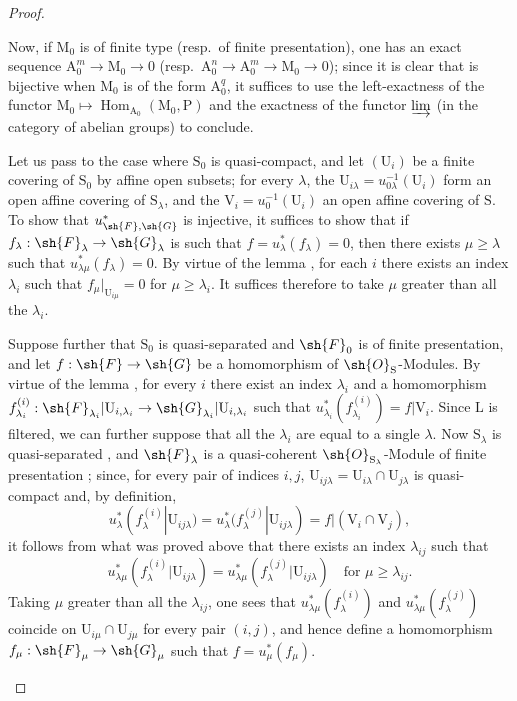\begin{proof}
\begin{enumerate}[label=(\roman*)]
Now, if $\mathrm{M}_0$ is of finite type (resp.\ of finite presentation), one has an exact sequence $\mathrm{A}_0^m\to\mathrm{M}_0\to 0$ (resp.\ $\mathrm{A}_0^n\to\mathrm{A}_0^m\to\mathrm{M}_0\to 0$); since it is clear that  is bijective when $\mathrm{M}_0$ is of the form $\mathrm{A}_0^q$, it suffices to use the left-exactness of the functor $\mathrm{M}_0\mapsto\operatorname{Hom}_{\mathrm{A}_0}(\mathrm{M}_0,\mathrm{P})$ and the exactness of the functor $\varinjlim$ (in the category of abelian groups) to conclude.

\medskip
Let us pass to the case where $\mathrm{S}_0$ is quasi-compact, and let $(\mathrm{U}_i)$ be a finite covering of $\mathrm{S}_0$ by affine open subsets; for every $\lambda$, the $\mathrm{U}_{i\lambda}=u_{0\lambda}^{-1}(\mathrm{U}_i)$ form an open affine covering of $\mathrm{S}_\lambda$, and the $\mathrm{V}_i=u_0^{-1}(\mathrm{U}_i)$ an open affine covering of $\mathrm{S}$.
To show that $u_{\sh{F},\sh{G}}^*$ is injective, it suffices to show that if $f_\lambda:\sh{F}_\lambda\to\sh{G}_\lambda$ is such that $f=u_\lambda^*(f_\lambda)=0$, then there exists $\mu\geqslant\lambda$ such that $u_{\lambda\mu}^*(f_\lambda)=0$.
By virtue of the lemma , for each $i$ there exists an index $\lambda_i$ such that $f_\mu|_{\mathrm{U}_{i\mu}}=0$ for $\mu\geqslant\lambda_i$.
It suffices therefore to take $\mu$ greater than all the $\lambda_i$.

Suppose further that $\mathrm{S}_0$ is quasi-separated and $\sh{F}_0$ is of finite presentation, and let $f:\sh{F}\to\sh{G}$ be a homomorphism of $\sh{O}_\mathrm{S}$-Modules.
By virtue of the lemma , for every $i$ there exist an index $\lambda_i$ and a homomorphism $f_{\lambda_i}^{(i)}:\sh{F}_{\lambda_i}|\mathrm{U}_{i,\lambda_i}\to\sh{G}_{\lambda_i}|\mathrm{U}_{i,\lambda_i}$ such that $u_{\lambda_i}^*(f_{\lambda_i}^{(i)})=f|\mathrm{V}_i$.
Since $\mathrm{L}$ is filtered, we can further suppose that all the $\lambda_i$ are equal to a single $\lambda$.
Now $\mathrm{S}_\lambda$ is quasi-separated , and $\sh{F}_\lambda$ is a quasi-coherent $\sh{O}_{\mathrm{S}_\lambda}$-Module of finite presentation ; since, for every pair of indices $i,j$, $\mathrm{U}_{ij\lambda}=\mathrm{U}_{i\lambda}\cap\mathrm{U}_{j\lambda}$ is quasi-compact and, by definition,
\[
  u_\lambda^*(f_\lambda^{(i)}|\mathrm{U}_{ij\lambda})=u_\lambda^*(f_\lambda^{(j)}|\mathrm{U}_{ij\lambda})=f|(\mathrm{V}_i\cap\mathrm{V}_j),
\]
it follows from what was proved above that there exists an index $\lambda_{ij}$ such that
\[
  u_{\lambda\mu}^*(f_\lambda^{(i)}|\mathrm{U}_{ij\lambda})=u_{\lambda\mu}^*(f_\lambda^{(j)}|\mathrm{U}_{ij\lambda})\quad\text{for }\mu\geqslant\lambda_{ij}.
\]
Taking $\mu$ greater than all the $\lambda_{ij}$, one sees that $u_{\lambda\mu}^*(f_\lambda^{(i)})$ and $u_{\lambda\mu}^*(f_\lambda^{(j)})$ coincide on $\mathrm{U}_{i\mu}\cap\mathrm{U}_{j\mu}$ for every pair $(i,j)$, and hence define a homomorphism $f_\mu:\sh{F}_\mu\to\sh{G}_\mu$ such that $f=u_\mu^*(f_\mu)$.

\end{enumerate}
\end{proof}

